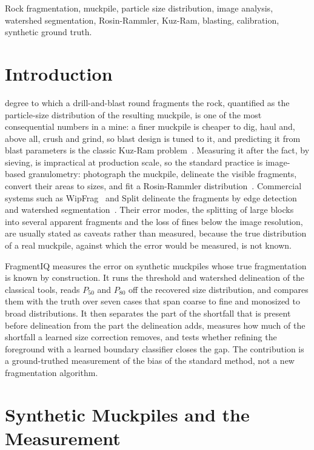 \documentclass[journal]{IEEEtran}
\begin{document}
\begin{IEEEkeywords}
Rock fragmentation, muckpile, particle size distribution, image analysis, watershed segmentation, Rosin-Rammler,
Kuz-Ram, blasting, calibration, synthetic ground truth.
\end{IEEEkeywords}

\section{Introduction}

 degree to which a drill-and-blast round fragments the rock, quantified as the particle-size
distribution of the resulting muckpile, is one of the most consequential numbers in a mine: a finer muckpile is
cheaper to dig, haul and, above all, crush and grind, so blast design is tuned to it, and predicting it from blast
parameters is the classic Kuz-Ram problem~\cite{kuznetsov,cunningham}. Measuring it after the fact, by sieving, is
impractical at production scale, so the standard practice is image-based granulometry: photograph the muckpile,
delineate the visible fragments, convert their areas to sizes, and fit a Rosin-Rammler distribution~\cite{rosin}.
Commercial systems such as WipFrag~\cite{maerz} and Split delineate the fragments by edge detection and watershed
segmentation~\cite{vincent}. Their error modes, the splitting of large blocks into several apparent fragments and the
loss of fines below the image resolution, are usually stated as caveats rather than measured, because the true
distribution of a real muckpile, against which the error would be measured, is not known.

FragmentIQ measures the error on synthetic muckpiles whose true fragmentation is known by construction. It runs the
threshold and watershed delineation of the classical tools, reads $P_{50}$ and $P_{80}$ off the recovered size
distribution, and compares them with the truth over seven cases that span coarse to fine and monosized to broad
distributions. It then separates the part of the shortfall that is present before delineation from the part the
delineation adds, measures how much of the shortfall a learned size correction removes, and tests whether refining
the foreground with a learned boundary classifier closes the gap. The contribution is a ground-truthed measurement of
the bias of the standard method, not a new fragmentation algorithm.

\section{Synthetic Muckpiles and the Measurement}\label{sec:method}
\end{document}
